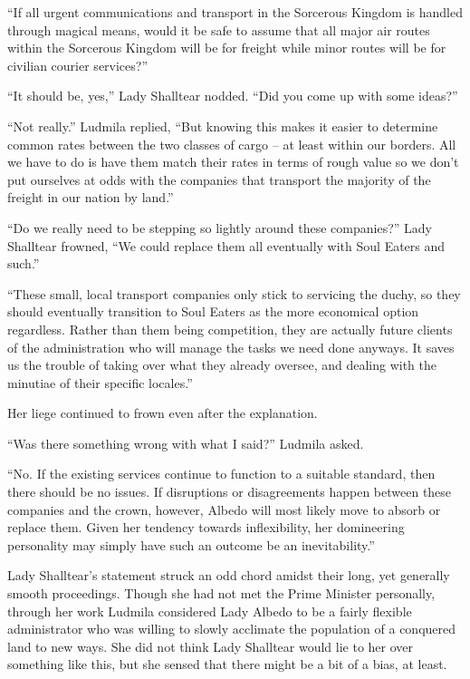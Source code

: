  

“If all urgent communications and transport in the Sorcerous Kingdom is handled through magical means, would it be safe to assume that all major air routes within the Sorcerous Kingdom will be for freight while minor routes will be for civilian courier services?”

 

“It should be, yes,” Lady Shalltear nodded. “Did you come up with some ideas?”

 

“Not really.” Ludmila replied, “But knowing this makes it easier to determine common rates between the two classes of cargo – at least within our borders. All we have to do is have them match their rates in terms of rough value so we don’t put ourselves at odds with the companies that transport the majority of the freight in our nation by land.”

 

“Do we really need to be stepping so lightly around these companies?” Lady Shalltear frowned, “We could replace them all eventually with Soul Eaters and such.”

 

“These small, local transport companies only stick to servicing the duchy, so they should eventually transition to Soul Eaters as the more economical option regardless. Rather than them being competition, they are actually future clients of the administration who will manage the tasks we need done anyways. It saves us the trouble of taking over what they already oversee, and dealing with the minutiae of their specific locales.”

 

Her liege continued to frown even after the explanation.

 

“Was there something wrong with what I said?” Ludmila asked.

 

“No. If the existing services continue to function to a suitable standard, then there should be no issues. If disruptions or disagreements happen between these companies and the crown, however, Albedo will most likely move to absorb or replace them. Given her tendency towards inflexibility, her domineering personality may simply have such an outcome be an inevitability.”

 

Lady Shalltear’s statement struck an odd chord amidst their long, yet generally smooth proceedings. Though she had not met the Prime Minister personally, through her work Ludmila considered Lady Albedo to be a fairly flexible administrator who was willing to slowly acclimate the population of a conquered land to new ways. She did not think Lady Shalltear would lie to her over something like this, but she sensed that there might be a bit of a bias, at least.

